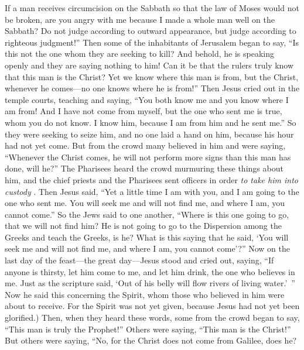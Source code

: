 \begin{biblechapter}
\verse If a man receives circumcision on the Sabbath so that the law of Moses would not be broken, are you angry with me because I made a whole man well on the Sabbath?
\verse Do not judge according to outward appearance, but judge according to righteous judgment!”
 Then some of the inhabitants of Jerusalem began to say, “Is this not the one whom they are seeking to kill?
\verse And behold, he is speaking openly and they are saying nothing to him! Can it be that the rulers truly know that this man is the Christ?
\verse Yet we know where this man is from, but the Christ, whenever he comes—no one knows where he is from!”
\verse Then Jesus cried out in the temple courts, teaching and saying, “You both know me and you know where I am from! And I have not come from myself, but the one who sent me is true, whom you do not know.
\verse I know him, because I am from him and he sent me.”
\verse So they were seeking to seize him, and no one laid a hand on him, because his hour had not yet come.
\verse But from the crowd many believed in him and were saying, “Whenever the Christ comes, he will not perform more signs than this man has done, will he?”
\verse The Pharisees heard the crowd murmuring these things about him, and the chief priests and the Pharisees sent officers in order \textit{to take him into custody }.
\verse Then Jesus said, “Yet a little time I am with you, and I am going to the one who sent me.
\verse You will seek me and will not find me, and where I am, you cannot come.”
\verse So the Jews said to one another, “Where is this one going to go, that we will not find him? He is not going to go to the Dispersion among the Greeks and teach the Greeks, is he?
\verse What is this saying that he said, ‘You will seek me and will not find me, and where I am, you cannot come’?”
 Now on the last day of the feast—the great day—Jesus stood and cried out, saying, “If anyone is thirsty, let him come to me, and let him drink,
\verse the one who believes in me. Just as the scripture said, ‘Out of his belly will flow rivers of living water.’ ”
\verse Now he said this concerning the Spirit, whom those who believed in him were about to receive. For the Spirit was not yet given, because Jesus had not yet been glorified.)
 Then, when they heard these words, some from the crowd began to say, “This man is truly the Prophet!”
\verse Others were saying, “This man is the Christ!” But others were saying, “No, for the Christ does not come from Galilee, does he?

\end{biblechapter}
